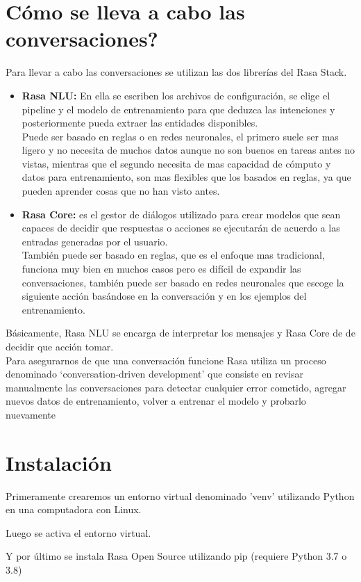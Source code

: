\section{Cómo se lleva a cabo las conversaciones?}
Para llevar a cabo las conversaciones se utilizan las dos librerías del Rasa Stack.
\begin{itemize}
	\item \textbf{Rasa NLU: } En ella  se escriben los archivos de configuración, se elige el
	      pipeline y el modelo de entrenamiento para que deduzca las intenciones y posteriormente pueda
	      extraer las entidades disponibles.\\
	      \indent Puede ser basado en reglas o en redes neuronales, el primero suele ser mas ligero y no
	      necesita de muchos datos aunque no son buenos en tareas antes no vistas, mientras que el segundo
	      necesita de mas capacidad de cómputo y datos para entrenamiento, son mas flexibles que los basados
	      en reglas, ya que pueden aprender cosas que no han visto antes.
	\item \textbf{Rasa Core: } es el gestor de diálogos utilizado para crear modelos que sean
	      capaces de decidir que respuestas o acciones se ejecutarán de acuerdo a las entradas generadas por
	      el usuario.\\
	      \indent También puede ser basado en reglas, que es el enfoque mas tradicional, funciona muy
	      bien en muchos casos pero es difícil de expandir las conversaciones, también puede ser basado en
	      redes neuronales que escoge la siguiente acción basándose en la conversación y en los ejemplos del
	      entrenamiento.
\end{itemize}
\indent Básicamente, Rasa NLU se encarga de interpretar los mensajes y Rasa Core de de decidir que
acción tomar.\\
\indent Para asegurarnos de que una conversación funcione Rasa utiliza un proceso denominado
‘conversation-driven development’ que consiste en revisar manualmente las conversaciones para
detectar cualquier error cometido, agregar nuevos datos de entrenamiento, volver a entrenar el
modelo y probarlo nuevamente\cite{Introduction_to_Rasa}
\section[Instalación de RASA]{Instalación}
Primeramente crearemos un entorno virtual denominado 'venv' utilizando Python en una computadora
con Linux.

\begin{center}
\end{center}
Luego se activa el entorno virtual.
\begin{center}
\end{center}
Y por último se instala Rasa Open Source utilizando pip (requiere Python 3.7 o 3.8)
\begin{center}
\end{center}

